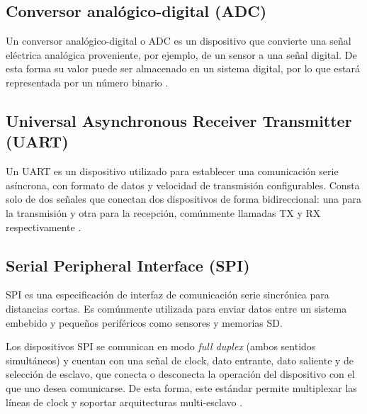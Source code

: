 \subsection{Conversor analógico-digital (ADC)}

Un conversor analógico-digital o ADC es un dispositivo que convierte una señal eléctrica analógica proveniente, por ejemplo, de un sensor a una señal digital. De esta forma su valor puede ser almacenado en un sistema digital, por lo que estará representada por un número binario \citep{WEBSITE:2}.

\subsection{Universal Asynchronous Receiver Transmitter (UART)}

Un UART es un dispositivo utilizado para establecer una comunicación serie asíncrona, con formato de datos y velocidad de transmisión configurables. Consta solo de dos señales que conectan dos dispositivos de forma bidireccional: una para la transmisión y otra para la recepción, comúnmente llamadas TX y RX respectivamente \citep{WEBSITE:3}.

\subsection{Serial Peripheral Interface (SPI)}

SPI es una especificación de interfaz de comunicación serie sincrónica para distancias cortas. Es comúnmente utilizada para enviar datos entre un sistema embebido y pequeños periféricos como sensores y memorias SD.

Los dispositivos SPI se comunican en modo \textit{full duplex} (ambos sentidos simultáneos) y cuentan con una señal de clock, dato entrante, dato saliente y de selección de esclavo, que conecta o desconecta la operación del dispositivo con el que uno desea comunicarse. De esta forma, este estándar permite multiplexar las líneas de clock y soportar arquitecturas multi-esclavo \citep{WEBSITE:SPI}.

